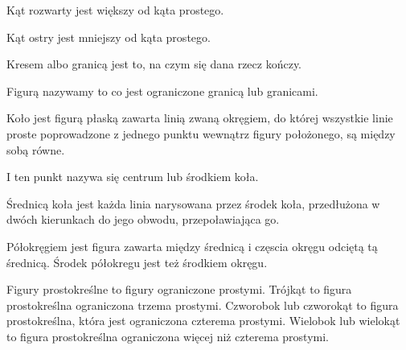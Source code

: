 \begin{euclid_definition}
    Kąt rozwarty jest większy od kąta prostego.
\end{euclid_definition}

\begin{euclid_definition}
    Kąt ostry jest mniejszy od kąta prostego.
\end{euclid_definition}

\begin{euclid_definition}
    Kresem albo granicą jest to, na czym się dana rzecz kończy.
\end{euclid_definition}

\begin{euclid_definition}
    Figurą nazywamy to co jest ograniczone granicą lub granicami. 
\end{euclid_definition}

\begin{euclid_definition}
    Koło jest figurą płaską zawarta linią zwaną okręgiem, do której wszystkie linie proste poprowadzone z jednego punktu wewnątrz figury położonego, są między sobą równe.
\end{euclid_definition}

\begin{euclid_definition}
    I ten punkt nazywa się centrum lub środkiem koła. 
\end{euclid_definition}

\begin{euclid_definition}
    Średnicą koła jest każda linia narysowana przez środek koła, przedłużona w dwóch kierunkach do jego obwodu, przepoławiająca go.
\end{euclid_definition}

\begin{euclid_definition}
    Półokręgiem jest figura zawarta między średnicą i częscia okręgu odciętą tą średnicą. Środek półokregu jest też środkiem okręgu.
\end{euclid_definition}

\begin{euclid_definition}
    Figury prostokreślne to figury ograniczone prostymi. Trójkąt to figura prostokreślna ograniczona trzema prostymi. Czworobok lub czworokąt to figura prostokreślna, która jest ograniczona czterema prostymi. Wielobok lub wielokąt to figura prostokreślna ograniczona więcej niż czterema prostymi.
\end{euclid_definition}

